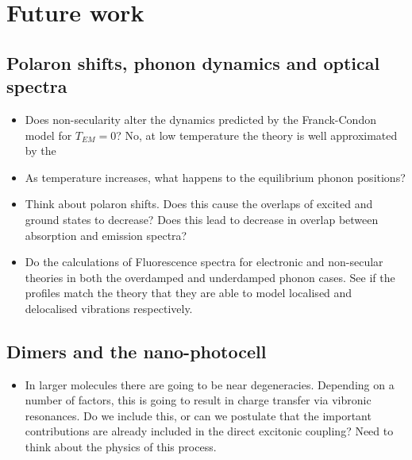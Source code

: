 \documentclass[]{article}
\begin{document}
\section{Future work}

\subsection{Polaron shifts, phonon dynamics and optical spectra}

\begin{itemize}
	\item Does non-secularity alter the dynamics predicted by the Franck-Condon model for $T_{EM}=0$? No, at low temperature the theory is well approximated by the 
	\item As temperature increases, what happens to the equilibrium phonon positions?
	\item Think about polaron shifts. Does this cause the overlaps of excited and ground states to decrease? Does this lead to decrease in overlap between absorption and emission spectra?
	\item Do the calculations of Fluorescence spectra for electronic and non-secular theories in both the overdamped and underdamped phonon cases. See if the profiles match the theory that they are able to model localised and delocalised vibrations respectively.
\end{itemize}


\subsection{Dimers and the nano-photocell}
\begin{itemize}
	\item In larger molecules there are going to be near degeneracies. Depending on a number of factors, this is going to result in charge transfer via vibronic resonances. Do we include this, or can we postulate that the important contributions are already included in the direct excitonic coupling? Need to think about the physics of this process.
\end{itemize}

\end{document}
